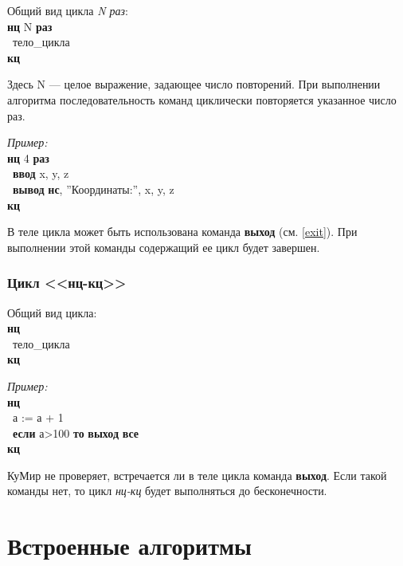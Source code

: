 \documentclass[12pt,a4paper]{article}
\newcommand{\otstup}{\textperiodcentered\ }
\begin{document}
Общий вид цикла \emph{N раз}:\\
{\sffamily
\textbf{нц} N \textbf{раз}\\
\otstup тело\_цикла\\
\textbf{кц}
}

Здесь N --- целое выражение, задающее число повторений. При выполнении алгоритма последовательность команд циклически повторяется указанное число раз.

\emph{Пример:}\\
{\sffamily
\textbf{нц} 4 \textbf{раз}\\
\otstup \textbf{ввод} x, y, z\\
\otstup \textbf{вывод} \textbf{нс}, ''Координаты:'', x, y, z\\
\textbf{кц}
}

В теле цикла может быть использована команда \textbf{выход} (см. \ref{exit}). При выполнении этой команды содержащий ее цикл будет завершен.

\subsubsection[Цикл ''нц-кц'']{Цикл <<нц-кц>>}

Общий вид цикла:\\
{\sffamily
\textbf{нц}\\
\otstup тело\_цикла\\
\textbf{кц}
}

\emph{Пример:}\\
{\sffamily
\textbf{нц}\\
\otstup а := а + 1\\
\otstup \textbf{если} а>100 \textbf{то} \textbf{выход} \textbf{все}\\
\textbf{кц}
}

КуМир не проверяет, встречается ли в теле цикла команда \textbf{выход}. Если такой команды нет, то цикл \emph{нц-кц} будет выполняться до бесконечности.

















\section{Встроенные алгоритмы}
\end{document}
